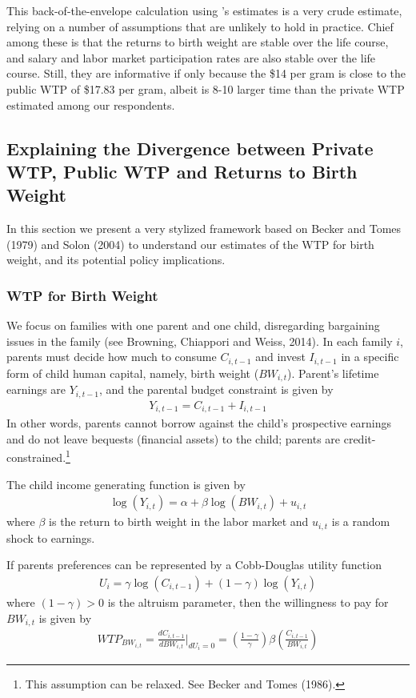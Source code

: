 \documentclass[a4paper, 11pt]{article}
\begin{document}
\begin{spacing}{1.4}
This back-of-the-envelope calculation using
\citet{BehrmanRosenzweig2004}'s estimates is a very crude estimate,
relying on a number of assumptions that are unlikely to hold in
practice.  Chief among these is that the returns to birth weight
are stable over the life course, and salary and labor market participation
rates are also stable over the life course. Still, they are informative if only because the \$14 per gram is close to the public WTP of \$17.83 per gram,
albeit is 8-10 larger time than the private WTP estimated among our respondents.


\subsection{Explaining the Divergence between Private WTP, Public WTP and Returns to Birth Weight}
In this section we present a very stylized framework based on Becker and Tomes (1979) and Solon (2004) to understand our estimates of the WTP for birth weight, and its potential policy implications.  

\subsubsection{WTP for Birth Weight}

We focus on families with one parent and one child, disregarding bargaining issues in the family (see Browning, Chiappori and Weiss, 2014). In each family $i$, parents must decide how much to consume $C_{i,t-1}$ and invest $I_{i,t-1}$ in a specific form of child human capital, namely, birth weight ($BW_{i,t}$). Parent's lifetime earnings are $Y_{i,t-1}$, and the parental budget constraint is given by
\begin{align*}
Y_{i,t-1} = C_{i,t-1} + I_{i,t-1}
\end{align*}
In other words, parents cannot borrow against the child's prospective earnings and do not leave bequests (financial assets) to the child; parents are credit-constrained.\footnote{This assumption can be relaxed. See Becker and Tomes (1986).}

The child income generating function is given by
\begin{align*}
\log(Y_{i,t}) = \alpha + \beta \log(BW_{i,t}) + u_{i,t}
\end{align*}%
where $\beta$ is the return to birth weight in the labor market and $u_{i,t}$ is a random shock to earnings.%

If parents preferences can be represented by a Cobb-Douglas utility function 
\begin{align*}
U_i = \gamma \log(C_{i,t-1}) + (1-\gamma) \log(Y_{i,t})
\end{align*}%
where $(1-\gamma) > 0$ is the altruism parameter, then the willingness to pay for $BW_{i,t}$ is given by
\begin{align}\label{WTP1}
WTP_{BW_{i,t}}=\frac{d C_{i,t-1}}{d BW_{i,t}}|_{dU_i=0}=\left(\frac{1-\gamma}{\gamma}\right)\beta \left(\frac{C_{i,t-1}}{BW_{i,t}}\right)
\end{align}%


\end{spacing}
\end{document}
